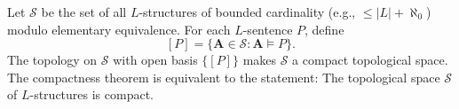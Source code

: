 Let $\mathcal{S}$ be the set of all $L$-structures of bounded cardinality (e.g., $\leq |L| + \aleph_0$) modulo elementary equivalence. For each $L$-sentence $P$, define
$$[P] = \{ \mathbf{A} \in \mathcal{S} : \mathbf{A} \vDash P \}.$$
The topology on $\mathcal{S}$ with open basis $\{[P]\}$ makes $\mathcal{S}$ a compact topological space. The compactness theorem is equivalent to the statement: The topological space $\mathcal{S}$ of $L$-structures is compact.
